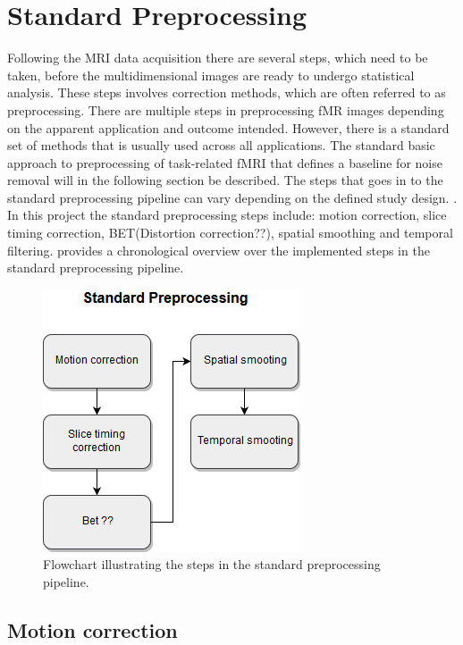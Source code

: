 \section{Standard Preprocessing}

Following the MRI data acquisition there are several steps, which need to be taken, before the multidimensional images are ready to undergo statistical analysis. These steps involves correction methods, which are often referred to as preprocessing. There are multiple steps in preprocessing fMR images depending on the apparent application and outcome intended. However, there is a standard set of methods that is usually used across all applications. \cite{Moayedi2018} The standard basic approach to preprocessing of task-related fMRI that defines a baseline for noise removal will in the following section be described. The steps that goes in to the standard preprocessing pipeline can vary depending on the defined study design. . In this project the standard preprocessing steps include: motion correction, slice timing correction, BET(Distortion correction??), spatial smoothing and temporal filtering.  provides a chronological overview over the implemented steps in the standard preprocessing pipeline.      

\begin{figure}[H]                 
	\includegraphics[width=.35\textwidth]{figures/bMethods/Standard_preprocessing} 
	\caption{Flowchart illustrating the steps in the standard preprocessing pipeline.}
	\label{fig:meth:std} 
\end{figure}

\subsection{Motion correction}


